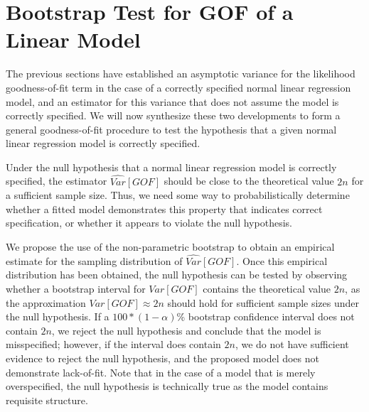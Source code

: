 		\section{Bootstrap Test for GOF of a Linear Model} \label{sec:boot_test}

		The previous sections have established an asymptotic variance for the likelihood goodness-of-fit term in the case of a correctly specified normal linear regression model, and an
		estimator for this variance that does not assume the model is correctly specified. We will now synthesize these two developments to form a general goodness-of-fit procedure to
		test the hypothesis that a given normal linear regression model is correctly specified.

		Under the null hypothesis that a normal linear regression model is correctly specified, the estimator $\widehat{Var}[GOF]$ should be close to the theoretical value $2n$ for a
		sufficient sample size. Thus, we need some way to probabilistically determine whether a fitted model demonstrates this property that indicates correct specification, or whether it
		appears to violate the null hypothesis.
		
		We propose the use of the non-parametric bootstrap to obtain an empirical estimate for the sampling distribution of $\widehat{Var}[GOF]$. Once this empirical distribution
		has been obtained, the null hypothesis can be tested by observing whether a bootstrap interval for $Var[GOF]$ contains the theoretical value $2n$, as the approximation
		$Var[GOF] \approx 2n$ should hold for sufficient sample sizes under the null hypothesis. If a $100*(1-\alpha)$\% bootstrap confidence interval does not contain 
		$2n$, we reject the null hypothesis and conclude that the model is misspecified; however, if the interval does contain $2n$, we do not have sufficient evidence to reject
		the null hypothesis, and the proposed model does not demonstrate lack-of-fit. Note that in the case of a model that is merely overspecified, the null hypothesis is technically
		true as the model contains requisite structure.


